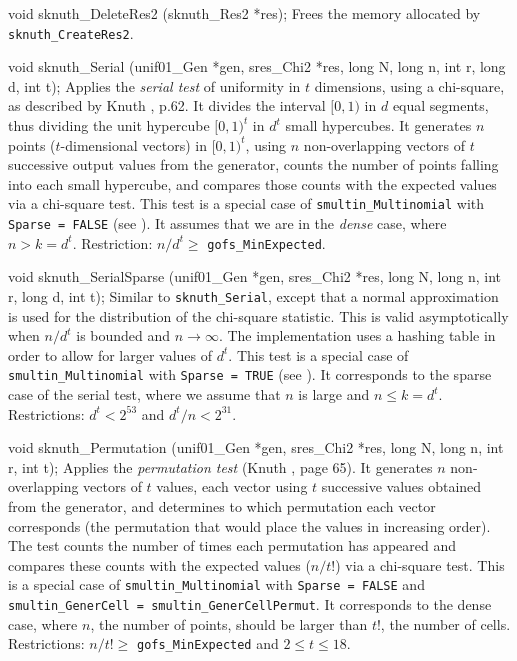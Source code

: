 void sknuth_DeleteRes2 (sknuth_Res2 *res);
\endcode
 \tab 
  Frees the memory allocated by {\tt sknuth\_CreateRes2}.
 \endtab




\fi %



\code

void sknuth_Serial (unif01_Gen *gen, sres_Chi2 *res,
                    long N, long n, int r, long d, int t);
\endcode
 \tab
  Applies the {\em serial test\/} of uniformity
  in $t$ dimensions,
  using a chi-square, as described by Knuth \cite{rKNU98a}, p.62. 
  It divides the interval $[0,1)$ in $d$ equal segments, thus dividing 
  the unit hypercube $[0,1)^t$ in $d^{t}$ small hypercubes. 
  It generates $n$ points ($t$-dimensional vectors) in $[0,1)^t$,
  using $n$ non-overlapping vectors of $t$ successive output values 
  from the generator, counts the number of points falling into 
  each small hypercube, and compares those counts with the expected
  values via a chi-square test.
  This test is a special case of {\tt smultin\_Multinomial} with 
  {\tt Sparse = FALSE} (see \cite{rLEC02c}).
  It assumes that we are in the {\em dense\/} case, where
  $n > k = d^t$.
  Restriction: $n / d^{t}\ge$ {\tt gofs\_MinExpected}.
 \endtab
\code


void sknuth_SerialSparse (unif01_Gen *gen, sres_Chi2 *res,
                          long N, long n, int r, long d, int t);
\endcode
 \tab
  Similar
   to {\tt sknuth\_Serial}, except that a normal approximation 
  is used for the distribution of the chi-square statistic.
  This is valid asymptotically when $n / d^t$ is bounded and
  $n\to\infty$.
  The implementation uses a hashing table in order to allow for 
  larger values of $d^t$.
  This test is a special case of {\tt smultin\_Multinomial} with
  {\tt Sparse = TRUE} (see \cite{rLEC02c}). 
  It corresponds to the sparse case of the serial test, where we assume
  that $n$ is large and $n \le k = d^t$.
  Restrictions: $d^t < 2^{53}$ and $d^{t}/n < 2^{31}$.
 \endtab
\code


void sknuth_Permutation (unif01_Gen *gen, sres_Chi2 *res,
                         long N, long n, int r, int t);
\endcode
 \tab 
   Applies
   the {\em permutation test\/} (Knuth \cite{rKNU98a}, page 65).
   It generates $n$ non-overlapping vectors of $t$ values, each vector
   using $t$ successive values obtained from the generator,
   and determines to which permutation each vector corresponds
   (the permutation that would place the values in increasing order).
   The test counts the number of times each permutation has appeared 
   and compares these counts with the expected values ($n/t!$) 
   via a chi-square test.
   This is a special case of {\tt smultin\_Multinomial} with
   {\tt Sparse = FALSE} and 
   {\tt smultin\_Gener\-Cell = smultin\_GenerCellPermut}. 
   It corresponds to the dense case, where  $n$, 
   the number of points, should be larger than  $t!$, the number of cells.
   Restrictions: $n/t! \ge$ {\tt gofs\_MinExpected} and $2 \le t \le 18$.
 \endtab
\code


